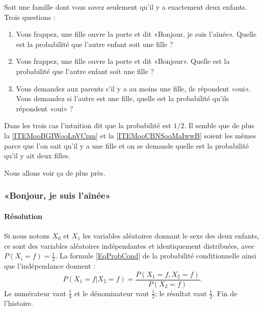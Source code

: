 Soit une famille dont vous savez seulement qu'il y a exactement deux enfants. Trois questions :
\begin{enumerate}
    \item       \label{ITEMooNUPAooWCXwBE}
        Vous frappez, une fille ouvre la porte et dit «Bonjour, je suis l'aînée». Quelle est la probabilité que l'autre enfant soit une fille ?
    \item   \label{ITEMooBGIWooLnVCpm}
        Vous frappez, une fille ouvre la porte et dit «Bonjour». Quelle est la probabilité que l'autre enfant soit une fille ?
    \item       \label{ITEMooCBNSooMaIwwB}
        Vous demandez aux parents s'il y a au moins une fille, ils répondent «oui». Vous demandez si l'autre est une fille, quelle est la probabilité qu'ils répondent «oui» ?
\end{enumerate}
Dans les trois cas l'intuition dit que la probabilité est \( 1/2\). Il semble que de plus la \ref{ITEMooBGIWooLnVCpm} et la \ref{ITEMooCBNSooMaIwwB} soient les mêmes parce que l'on sait qu'il y a une fille et on se demande quelle est la probabilité qu'il y ait deux filles.

Nous allons voir ça de plus près. 

\subsubsection{«Bonjour, je suis l'aînée»}

\paragraph{Résolution}

Si nous notons \( X_0\) et \( X_1\) les variables aléatoires donnant le sexe des deux enfants, ce sont des variables aléatoires indépendantes et identiquement distribuées, avec \( P(X_i=f)=\frac{ 1 }{2}\). La formule \eqref{EqProbCond} de la probabilité conditionnelle ainsi que l'indépendance donnent :
\begin{equation}
    P(X_1=f|X_2=f)=\frac{ P(X_1=f,X_2=f) }{ P(X_2=f) }.
\end{equation}
Le numérateur vaut \( \frac{1}{ 4 }\) et le dénominateur vaut \( \frac{ 1 }{2}\); le résultat vaut \( \frac{ 1 }{2}\). Fin de l'histoire.

